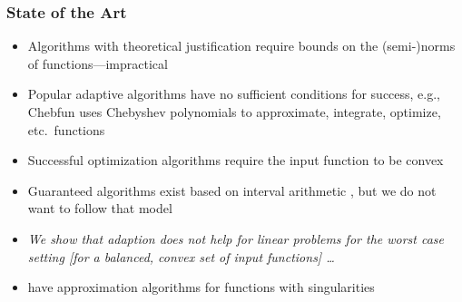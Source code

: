 \documentclass[10pt,compress,xcolor={usenames,dvipsnames},aspectratio=169]{beamer}
\begin{document}
\begin{frame}
	\frametitle{State of the Art}
	
	\vspace{-3ex}
	
	\begin{itemize}
		\item Algorithms with \alert{theoretical justification} require bounds on the (semi-)norms of functions---impractical
		
		\item Popular adaptive algorithms have no sufficient conditions for success, e.g., \alert{Chebfun} \cite{TrefEtal16b} uses Chebyshev polynomials to approximate, integrate, optimize, etc.\ functions 
		
		\item Successful optimization algorithms require the input function to be \alert{convex}
		
		\item Guaranteed algorithms exist based on \alert{interval arithmetic} \cites{Rum99a, Rum10a}, but we do not want to follow that model
		
		\item \emph{We show that \alert{adaption does not help} for linear problems for the worst case setting [for a balanced, convex set of input functions] \ldots } \alert{\cite{Woz88a}}
		
		\item {} have approximation algorithms for functions with \alert{singularities}
		
		
	\end{itemize}
\end{frame}

\end{document}
